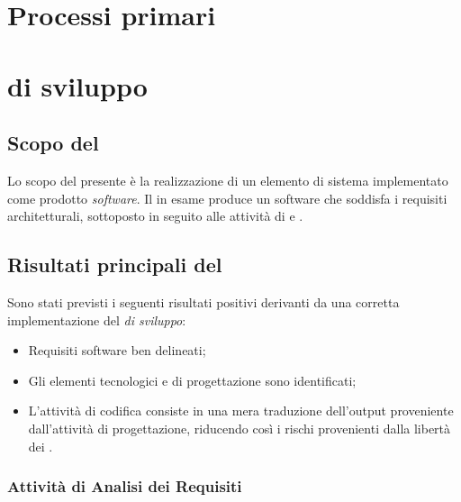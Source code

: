 \section{Processi primari}
	\section{ di sviluppo}
        \subsection{Scopo del }
        Lo scopo del presente  \`e la realizzazione di un elemento di sistema implementato come prodotto
        \textit{software}. Il  in esame produce un software che soddisfa i requisiti architetturali, sottoposto
        in seguito alle attivit\`a di  e .
        \subsection{Risultati principali del }
        Sono stati previsti i seguenti risultati positivi derivanti da una corretta implementazione del \textit{ di sviluppo}:
        \begin{itemize}
          \item Requisiti software ben delineati;
          \item Gli elementi tecnologici e di progettazione sono identificati;
          \item L'attivit\`a di codifica consiste in una mera traduzione dell'output proveniente dall'attivit\`a di progettazione,
            riducendo cos\`i i rischi provenienti dalla libert\`a dei .
        \end{itemize}
        
		\subsubsection{Attività di Analisi dei Requisiti}
